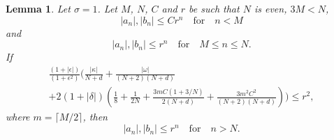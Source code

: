 \documentclass[10pt,a4paper]{amsart}
\newtheorem{lemma}{Lemma}
\begin{document}
\begin{lemma}\label{lemma:tail-bound}
  Let \(\sigma = 1\). Let \(M\), \(N\), \(C\) and \(r\) be such that
  \(N\) is even, \(3M < N\),
  \begin{equation*}
    |a_n|, |b_n| \leq C r^n \quad\text{for}\quad n < M
  \end{equation*}
  and
  \begin{equation*}
    |a_n|, |b_n| \leq r^n \quad\text{for}\quad M \leq n \leq N.
  \end{equation*}
  If
  \begin{multline}
    \label{eq:tail-bound-inequality}
    \frac{(1 + |\epsilon|)}{(1 + \epsilon^{2})}\Bigg(
      \frac{|\kappa|}{N + d}
      + \frac{|\omega|}{(N + 2)(N + d)}\\
      + 2(1 + |\delta|)\left(
        \frac{1}{8} + \frac{1}{2N}
        + \frac{3mC(1 + 3/N)}{2(N + d)}
        + \frac{3m^{2}C^{2}}{(N + 2)(N + d)}
      \right)
    \Bigg) \leq r^2,
  \end{multline}
  where \(m = \lceil M / 2 \rceil\), then
  \begin{equation*}
    |a_{n}|, |b_{n}| \leq r^{n} \quad\text{for}\quad n > N.
  \end{equation*}
\end{lemma}
\end{document}
